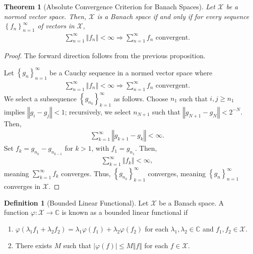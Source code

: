 \documentclass[10pt]{extarticle}
\newcommand{\C}{\mathbb{C}}
\newcommand{\norm}[1]{\left\Vert #1\right\Vert}
\newcommand{\set}[1]{\left\{#1\right\}}
\theoremstyle{plain}
\newtheorem*{theorem}{Theorem}
\theoremstyle{definition}
\newtheorem*{definition}{Definition}
\theoremstyle{note}
\renewcommand{\newline}{\hfill\break}
\begin{document}
\begin{theorem}[Absolute Convergence Criterion for Banach Spaces]
  Let $\mathcal{X}$ be a normed vector space. Then, $\mathcal{X}$ is a Banach space if and only if for every sequence $\set{f_{n}}_{n=1}^{\infty}$ of vectors in $\mathcal{X}$,
  \begin{align*}
    \sum_{n=1}^{\infty}\norm{f_n} < \infty \Rightarrow \sum_{n=1}^{\infty}f_n\text{ convergent.}
  \end{align*}
\end{theorem}
\begin{proof}
  The forward direction follows from the previous proposition.\newline

  Let $\set{g_n}_{n=1}^{\infty}$ be a Cauchy sequence in a normed vector space where
  \begin{align*}
    \sum_{n=1}^{\infty}\norm{f_n} < \infty \Rightarrow \sum_{n=1}^{\infty}f_n\text{ convergent.}
  \end{align*}
  We select a subsequence $\set{g_{n_k}}_{k=1}^{\infty}$ as follows. Choose $n_1$ such that $i,j\geq n_1$ implies $\norm{g_i - g_j} < 1$; recursively, we select $n_{N+1}$ such that $\norm{g_{N+1} - g_N} < 2^{-N}$. Then,
  \begin{align*}
    \sum_{k=1}^{\infty}\norm{g_{k+1} - g_k} < \infty.
  \end{align*}
  Set $f_k = g_{n_k} - g_{n_{k-1}}$ for $k > 1$, with $f_1 = g_{n_1}$. Then,
  \begin{align*}
    \sum_{k=1}^{\infty}\norm{f_{k}} < \infty,
  \end{align*}
  meaning $\displaystyle\sum_{k=1}^{\infty}f_k$ converges. Thus, $\set{g_{n_k}}_{k=1}^{\infty}$ converges, meaning $\set{g_{n}}_{n=1}^{\infty}$ converges in $\mathcal{X}$.
\end{proof}
\begin{definition}[Bounded Linear Functional]
Let $\mathcal{X}$ be a Banach space. A function $\varphi: \mathcal{X}\rightarrow \C$ is known as a bounded linear functional if
\begin{enumerate}[(1)]
  \item $\displaystyle \varphi(\lambda_1f_1 + \lambda_2f_2) = \lambda_1\varphi(f_1) + \lambda_2\varphi(f_2)$ for each $\lambda_1,\lambda_2\in \C$ and $f_1,f_2\in \mathcal{X}$.
  \item There exists $M$ such that $|\varphi(f)| \leq M\norm{f}$ for each $f\in \mathcal{X}$.
\end{enumerate}
\end{definition}
\end{document}
